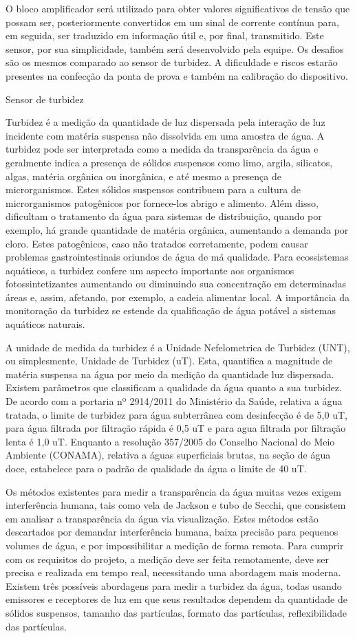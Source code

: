 O bloco amplificador será utilizado para obter valores significativos de tensão que possam ser, posteriormente convertidos em um sinal de corrente contínua para, em seguida, ser traduzido em informação útil e, por final, transmitido. Este sensor, por sua simplicidade, também será desenvolvido pela equipe.
Os desafios são os mesmos comparado ao sensor de turbidez. A dificuldade e riscos estarão presentes na confecção da ponta de prova e também na calibração do dispositivo.


Sensor de turbidez
 
Turbidez é a medição da quantidade de luz dispersada pela interação de luz incidente com matéria suspensa não dissolvida em uma amostra de água. A turbidez pode ser interpretada como a medida da transparência da água e geralmente indica a presença de sólidos suspensos como limo, argila, silicatos, algas, matéria orgânica ou inorgânica, e até mesmo a presença de microrganismos. Estes sólidos suspensos contribuem para a cultura de microrganismos patogênicos por fornece-los abrigo e alimento. Além disso, dificultam o tratamento da água para sistemas de distribuição, quando por exemplo, há grande quantidade de matéria orgânica, aumentando a demanda por cloro. Estes patogênicos, caso não tratados corretamente, podem causar problemas gastrointestinais oriundos de água de má qualidade. Para ecossistemas aquáticos, a turbidez confere um aspecto importante aos organismos fotossintetizantes aumentando ou diminuindo sua concentração em determinadas áreas e, assim, afetando, por exemplo, a cadeia alimentar local. A importância da monitoração da turbidez se estende da qualificação de água potável a sistemas aquáticos naturais.

A unidade de medida da turbidez é a Unidade Nefelometrica de Turbidez (UNT), ou simplesmente, Unidade de Turbidez (uT). Esta, quantifica a magnitude de matéria suspensa na água por meio da medição da quantidade luz dispersada. Existem parâmetros que classificam a qualidade da água quanto a sua turbidez. De acordo com a portaria nº 2914/2011 do Ministério da Saúde, relativa a água tratada, o limite de turbidez para água subterrânea com desinfecção é de 5,0 uT, para água filtrada por filtração rápida é 0,5 uT e para agua filtrada por filtração lenta é 1,0 uT. Enquanto a resolução 357/2005 do Conselho Nacional do Meio Ambiente (CONAMA), relativa a águas superficiais brutas, na seção de água doce, estabelece para o padrão de qualidade da água o limite de 40 uT.

Os métodos existentes para medir a transparência da água muitas vezes exigem interferência humana, tais como vela de Jackson e tubo de Secchi, que consistem em analisar a transparência da água via visualização. Estes métodos estão descartados por demandar interferência humana, baixa precisão para pequenos volumes de água, e por impossibilitar a medição de forma remota. Para cumprir com os requisitos do projeto, a medição deve ser feita remotamente, deve ser precisa e realizada em tempo real, necessitando uma abordagem mais moderna. Existem três possíveis abordagens para medir a turbidez da água, todas usando emissores e receptores de luz em que seus resultados dependem da quantidade de sólidos suspensos, tamanho das partículas, formato das partículas, reflexibilidade das partículas. 

